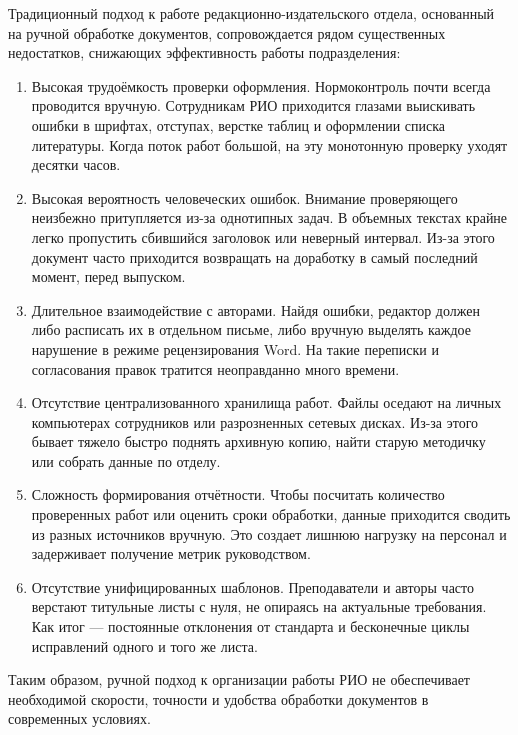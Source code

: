 Традиционный подход к работе редакционно-издательского отдела, основанный на ручной обработке документов, сопровождается рядом существенных недостатков, снижающих эффективность работы подразделения:
\begin{enumerate}
\item{Высокая трудоёмкость проверки оформления.} Нормоконтроль почти всегда проводится вручную. Сотрудникам РИО приходится глазами выискивать ошибки в шрифтах, отступах, верстке таблиц и оформлении списка литературы. Когда поток работ большой, на эту монотонную проверку уходят десятки часов.

\item{Высокая вероятность человеческих ошибок.} Внимание проверяющего неизбежно притупляется из-за однотипных задач. В объемных текстах крайне легко пропустить сбившийся заголовок или неверный интервал. Из-за этого документ часто приходится возвращать на доработку в самый последний момент, перед выпуском.

\item{Длительное взаимодействие с авторами.} Найдя ошибки, редактор должен либо расписать их в отдельном письме, либо вручную выделять каждое нарушение в режиме рецензирования Word. На такие переписки и согласования правок тратится неоправданно много времени.

\item{Отсутствие централизованного хранилища работ.} Файлы оседают на личных компьютерах сотрудников или разрозненных сетевых дисках. Из-за этого бывает тяжело быстро поднять архивную копию, найти старую методичку или собрать данные по отделу.

\item{Сложность формирования отчётности.} Чтобы посчитать количество проверенных работ или оценить сроки обработки, данные приходится сводить из разных источников вручную. Это создает лишнюю нагрузку на персонал и задерживает получение метрик руководством.

\item{Отсутствие унифицированных шаблонов.} Преподаватели и авторы часто верстают титульные листы с нуля, не опираясь на актуальные требования. Как итог — постоянные отклонения от стандарта и бесконечные циклы исправлений одного и того же листа.
\end{enumerate}

Таким образом, ручной подход к организации работы РИО не обеспечивает необходимой скорости, точности и удобства обработки документов в современных условиях.

